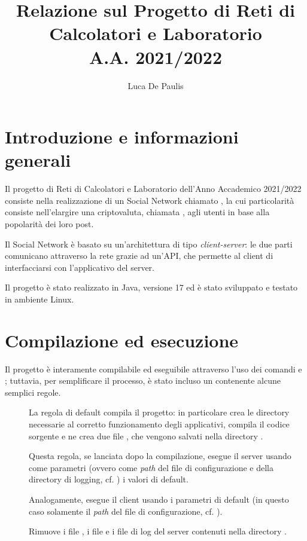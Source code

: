 \documentclass[
    oneside,
    10pt,
    language=italian,
    a4paper,
    article
]{notes}
\author{Luca De Paulis}
\title{Relazione sul Progetto di Reti di Calcolatori e Laboratorio \\
    \large A.A. 2021/2022 }
\begin{document}
\maketitle

\section{Introduzione e informazioni generali}
Il progetto di Reti di Calcolatori e Laboratorio dell'Anno Accademico 2021/2022
consiste nella realizzazione di un Social Network chiamato ,
la cui particolarità consiste nell'elargire una criptovaluta, chiamata 
, agli utenti in base alla popolarità dei loro post.

Il Social Network è basato su un'architettura di tipo \emph{client-server}:
le due parti comunicano attraverso la rete grazie ad un'API, che permette
al client di interfacciarsi con l'applicativo del server.

Il progetto è stato realizzato in Java, versione 17 ed è stato sviluppato e 
testato in ambiente Linux.

\section{Compilazione ed esecuzione}
Il progetto è interamente compilabile ed eseguibile attraverso l'uso dei comandi
 e ; tuttavia, per semplificare il processo, è stato
incluso un  contenente alcune semplici regole.
\begin{description}
    \item[] La regola di default compila il progetto: in particolare 
        crea le directory necessarie al corretto funzionamento degli applicativi,
        compila il codice sorgente e ne crea due file , che vengono
        salvati nella directory .
    \item[] Questa regola, se lanciata dopo la
        compilazione, esegue il server usando come parametri (ovvero come 
        \emph{path} del file di configurazione e della directory di logging, 
        cf. ) i valori di default.
    \item[] Analogamente, esegue il client usando
        i parametri di default (in questo caso solamente il \emph{path} del
        file di configurazione, cf. ).  
    \item[] Rimuove i file , i file 
        e i file di log del server contenuti nella directory . 
\end{description}
\end{document}

